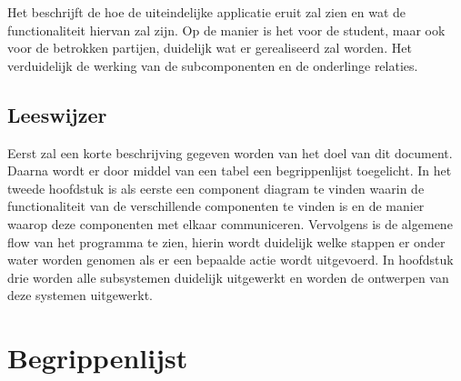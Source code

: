 \documentclass[a4paper, 11pt, oneside]{report}
\begin{document}
Het beschrijft de hoe de uiteindelijke applicatie eruit zal zien en wat de functionaliteit hiervan zal zijn. Op de manier is het voor de student, maar ook voor de betrokken partijen, duidelijk wat er gerealiseerd zal worden. Het verduidelijk de werking van de subcomponenten en de onderlinge relaties. 

\section{Leeswijzer}
\label{inleiding:beschrijving:leeswijzer}
Eerst zal een korte beschrijving gegeven worden van het doel van dit document. Daarna wordt er door middel van een tabel een begrippenlijst toegelicht. In het tweede hoofdstuk is als eerste een component diagram te vinden waarin de functionaliteit van de verschillende componenten te vinden is en de manier waarop deze componenten met elkaar communiceren. Vervolgens is de algemene flow van het programma te zien, hierin wordt duidelijk welke stappen er onder water worden genomen als er een bepaalde actie wordt uitgevoerd. In hoofdstuk drie worden alle subsystemen duidelijk uitgewerkt en worden de ontwerpen van deze systemen uitgewerkt. 
\chapter*{Begrippenlijst}
\label{inleiding:begrippenlijst}
\end{document}

